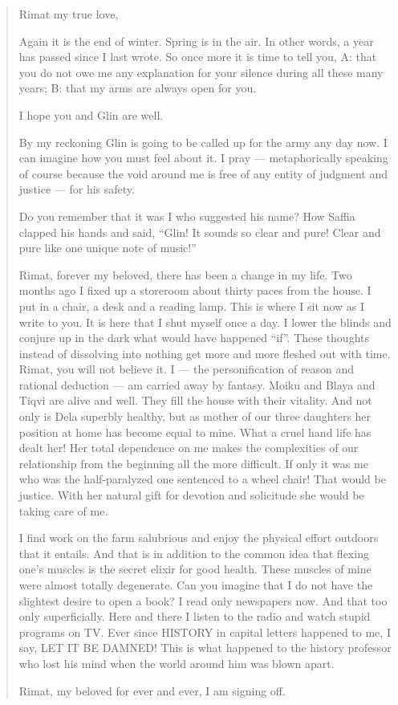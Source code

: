 \documentclass[twoside,11pt,openany]{book}
\begin{document}
\begin{quotation}
Rimat my true love,

Again it is the end of winter. Spring is in the air. In other words,  a year has passed since I last wrote. So once
more it is time to tell you, A: that you do not owe me any explanation for your silence during all these many years;
B: that my arms are always open for you.

I hope you and Glin are well.

By my reckoning Glin is going to be called up for the army any day now. I can imagine how you must feel about it. I pray
--- metaphorically speaking of course because the void around me is free of any entity of judgment and justice --- for his
safety.

Do you remember that it was I who suggested his name? How Saffia clapped his hands and said, ``Glin! It
sounds so clear and pure! Clear and pure like one unique {note of music}!''

Rimat, forever my beloved, there has been a change in my life. Two months ago I fixed up a storeroom about thirty paces
from the house. I put in a chair, a desk and a reading lamp. This is where I sit now as I write to you. It is here that I
shut myself once a day. I lower the blinds and conjure up in the dark what would have happened
``if''.  These thoughts instead of dissolving into nothing get more and more fleshed out with
time. Rimat, you will not believe it. I --- the personification of reason and rational deduction --- am carried away by
fantasy.  Moiku and Blaya and Tiqvi are alive and well. They fill the house with their vitality. And not only is Dela
superbly healthy, but as mother of our three daughters her position at home has become equal to mine. What a cruel hand
life has dealt her! Her total dependence on me makes the complexities of our relationship from the beginning all the
more difficult.  If only it was me who was the half-paralyzed one sentenced to a wheel chair! That would be justice.
With her natural gift for devotion and solicitude she would be taking care of me.

I find work on the farm salubrious and enjoy the physical effort outdoors that it entails.  And that is in addition to
the common idea that flexing one's muscles is the secret elixir for good health. These muscles of mine were almost
totally degenerate. Can you imagine that I do not have the slightest desire to open a book? I read only newspapers now.
And that too only superficially. Here and there I listen to the radio and watch stupid programs on TV. Ever since
HISTORY in capital letters happened to me, I say, LET IT BE DAMNED! This is what happened to the history professor who
lost his mind when the world around him was blown apart.

Rimat, my beloved for ever and ever, I am signing off.
\end{quotation}
\end{document}
